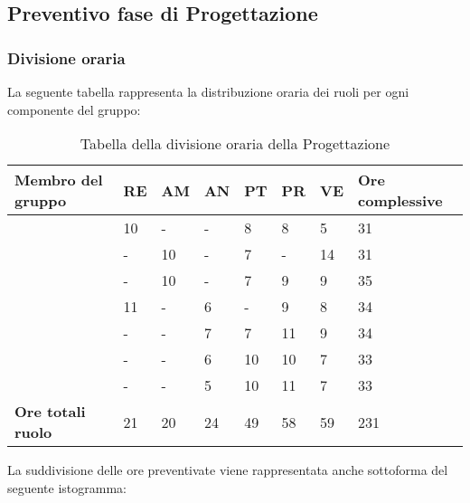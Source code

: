 \subsection{Preventivo fase di Progettazione}

\subsubsection{Divisione oraria}
La seguente tabella rappresenta la distribuzione oraria dei ruoli per ogni componente del gruppo:
\renewcommand{\arraystretch}{2}
\begin{longtable}[h!] { C{3.5cm} C{1cm} C{1cm} C{1cm} C{1cm} C{1cm} C{1cm} C{2cm}}
\caption{Tabella della divisione oraria della Progettazione}\\
\rowcolor{\primaryColor}

\textcolor{\secondaryColor}{\textbf{Membro del gruppo}} & 
\textcolor{\secondaryColor}{\textbf{RE}} & 
\textcolor{\secondaryColor}{\textbf{AM}} & 
\textcolor{\secondaryColor}{\textbf{AN}} & 
\textcolor{\secondaryColor}{\textbf{PT}} & 
\textcolor{\secondaryColor}{\textbf{PR}} & 
\textcolor{\secondaryColor}{\textbf{VE}} & 
\textcolor{\secondaryColor}{\textbf{Ore complessive}}\\	
\endhead
        
\AW{}                     & 10  & - & - & 8 & 8 & 5 & 31 \\
\AT{}                     & -  & 10 & - & 7 & - & 14 & 31 \\
\AD{}                     & -  & 10 & - & 7 & 9 & 9 & 35 \\
\EC{}                     & 11  & - & 6 & - & 9 & 8 & 34 \\
\EM{}                     & -  & - & 7 & 7 & 11 & 9 & 34 \\
\FP{}                     & -  & - & 6 & 10 & 10 & 7 & 33 \\
\GG{}                     & -  & - & 5 & 10 & 11 & 7 & 33 \\
\textbf{Ore totali ruolo} & 21 & 20 & 24 & 49 & 58 & 59 & 231 \\

		
\end{longtable}
La suddivisione delle ore preventivate viene rappresentata anche sottoforma del seguente istogramma:
